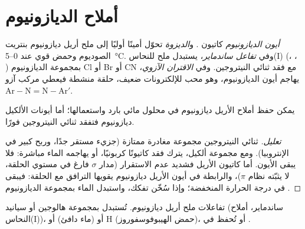 \section{أملاح الديازونيوم}

\begin{definition}\label{def:b2:amines:diazonium}
\emph{أيون الديازونيوم} كاتيون . و\emph{الديزوة}
تحوّل أمينًا  أوليًا إلى ملح أريل ديازونيوم بنتريت الصوديوم وحمض قوي عند
0--\qty{5}{\degreeCelsius}. وفي \emph{تفاعل ساندماير}، يستبدل ملح للنحاس(I)
(، ، ) بمجموعة الديازونيوم Cl أو Br أو CN مع فقد
ثنائي النيتروجين. وفي \emph{الاقتران الآزوي}، يهاجم أيون الديازونيوم، وهو محب للإلكترونات ضعيف،
حلقة  منشطة فيعطي مركب آزو $\mathrm{Ar{-}N{=}N{-}Ar'}$.
\end{definition}

\begin{proposition}\label{prop:b2:amines:diazonium}
يمكن حفظ أملاح الأريل ديازونيوم في محلول مائي بارد واستعمالها؛ أما أيونات الألكيل ديازونيوم فتفقد
ثنائي النيتروجين فورًا.
\end{proposition}

\begin{proof}[تعليل]
ثنائي النيتروجين مجموعة مغادرة ممتازة (جزيء مستقر جدًا، وربح كبير في الإنتروبيا). ومع
مجموعة ألكيل، يترك فقد  كاتيونًا كربونيًا، أو يهاجمه الماء مباشرة: فلا يبقى
الأيون. أما كاتيون الأريل فشديد عدم الاستقرار (مدار $\sigma$ فارغ في مستوي الحلقة،
لا يثبّته نظام $\pi$)، والرابطة  في أيون الأريل ديازونيوم
يقويها الترافق مع الحلقة: فيبقى في درجة الحرارة المنخفضة؛ وإذا سُخّن تفكك،
واستبدل الماء بمجموعة الديازونيوم .
\end{proof}

\begin{omfigure}

{\small تفاعلات ملح أريل ديازونيوم. تُستبدل بمجموعة  هالوجين أو
سيانيد (ساندماير، أملاح النحاس(I))، أو  (ماء دافئ) أو H (حمض الهيبوفوسفوروز)، أو
تُحفظ في .}
\end{omfigure}

